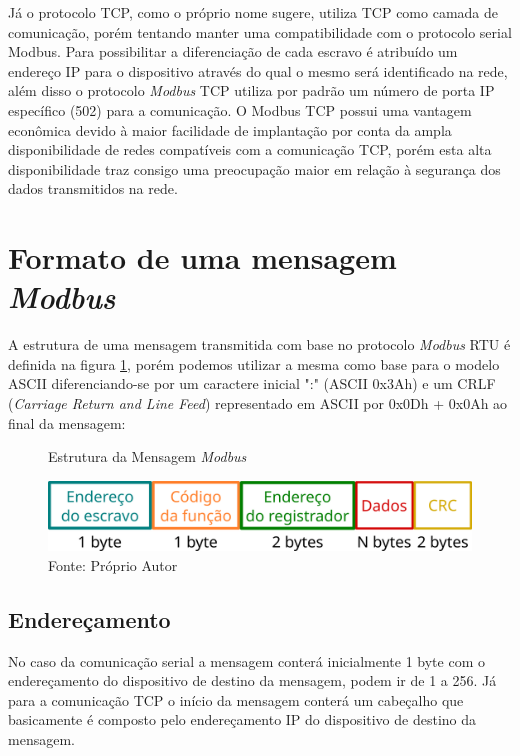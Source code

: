 Já o protocolo TCP, como o próprio nome sugere, utiliza TCP como camada de comunicação, porém tentando manter uma compatibilidade com o protocolo serial Modbus. Para possibilitar a diferenciação de cada escravo é atribuído um endereço IP para o dispositivo através do qual o mesmo será identificado na rede, além disso o protocolo \textit{Modbus} TCP utiliza por padrão um número de porta IP específico (502) para a comunicação. O Modbus TCP possui uma vantagem econômica devido à maior facilidade de implantação por conta da ampla disponibilidade de redes compatíveis com a comunicação TCP, porém esta alta disponibilidade traz consigo uma preocupação maior em relação à segurança dos dados transmitidos na rede. 


\section{Formato de uma mensagem \textit{Modbus}}

A estrutura de uma mensagem transmitida com base no protocolo \textit{Modbus} RTU é definida na figura \ref{fig:Modbus}, porém podemos utilizar a mesma como base para o modelo ASCII diferenciando-se por um caractere inicial ":" (ASCII 0x3Ah) 
e um CRLF (\textit{Carriage Return and Line Feed}) representado em ASCII por 0x0Dh + 0x0Ah ao final da mensagem:
\newline

\begin{figure}[h]
\caption{Estrutura da Mensagem \textit{Modbus}}
\centering
\includegraphics[width=1.0\textwidth,height=1.0\textheight,keepaspectratio]{imagens/mensagem-modbus.png}
\caption*{Fonte: Próprio Autor}
\label{fig:Modbus}
\end{figure}

\subsection{Endereçamento}

No caso da comunicação serial a mensagem conterá inicialmente 1 byte com o endereçamento do dispositivo de destino da mensagem, podem ir de 1 a 256. Já para a comunicação TCP o início da mensagem conterá um cabeçalho que basicamente é composto pelo endereçamento IP do dispositivo de destino da mensagem.

